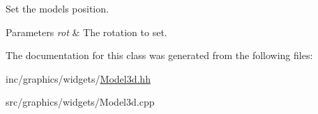 Set the model\textquotesingle{}s position. 


\begin{DoxyParams}{Parameters}
{\em rot} & The rotation to set. \\
\hline
\end{DoxyParams}


The documentation for this class was generated from the following files\+:\begin{DoxyCompactItemize}
\item 
inc/graphics/widgets/\hyperlink{Model3d_8hh}{Model3d.\+hh}\item 
src/graphics/widgets/Model3d.\+cpp\end{DoxyCompactItemize}
